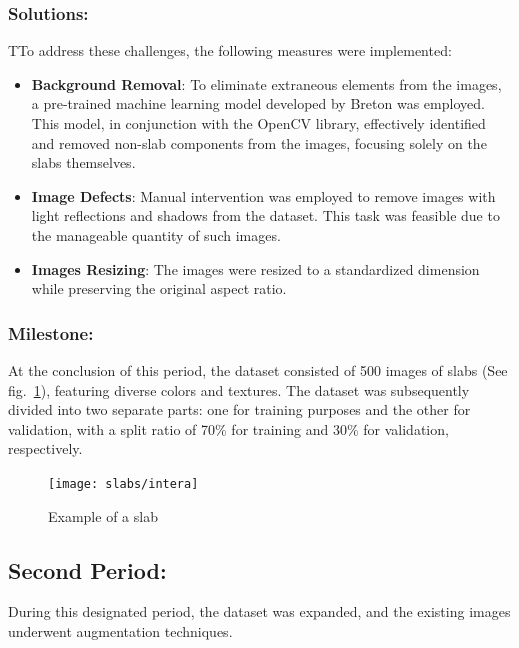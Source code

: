 \subsubsection{Solutions:}
TTo address these challenges, the following measures were implemented:
\begin{itemize}
    \item \textbf{Background Removal}: To eliminate extraneous elements from the images, a pre-trained machine learning model developed by Breton was employed. 
    This model, in conjunction with the OpenCV library, effectively identified and removed non-slab components from the images, focusing solely on the slabs themselves.
    \item \textbf{Image Defects}: Manual intervention was employed to remove images with light reflections and shadows from the dataset. 
    This task was feasible due to the manageable quantity of such images.
    \item \textbf{Images Resizing}: The images were resized to a standardized dimension while preserving the original aspect ratio.
\end{itemize}
\subsubsection{Milestone:}
At the conclusion of this period, the dataset consisted of 500 images of slabs (See fig.~\ref{fig:slab-sample}), featuring diverse colors and textures. 
The dataset was subsequently divided into two separate parts: one for training purposes and the other for validation, with a split ratio of 70\% for training and 30\% for validation, respectively.
\begin{figure}
    \centering
    \texttt{[image: slabs/intera]}
    \caption{Example of a slab}\label{fig:slab-sample}
\end{figure}

\subsection{Second Period:}
During this designated period, the dataset was expanded, and the existing images underwent augmentation techniques.

